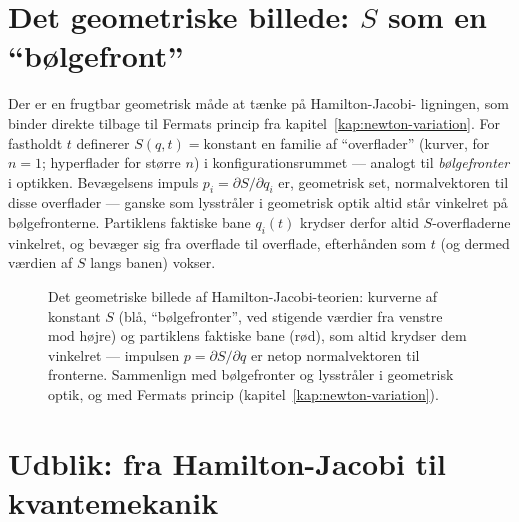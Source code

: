 \section{Det geometriske billede: $S$ som en ``bølgefront''}

Der er en frugtbar geometrisk måde at tænke på Hamilton-Jacobi-
ligningen, som binder direkte tilbage til Fermats princip fra
kapitel~\ref{kap:newton-variation}. For fastholdt $t$ definerer
$S(q,t)=\text{konstant}$ en familie af ``overflader'' (kurver, for
$n=1$; hyperflader for større $n$) i konfigurationsrummet — analogt til
\emph{bølgefronter} i optikken. Bevægelsens impuls $p_i=\partial S/\partial q_i$
er, geometrisk set, normalvektoren til disse overflader — ganske som
lysstråler i geometrisk optik altid står vinkelret på bølgefronterne.
Partiklens faktiske bane $q_i(t)$ krydser derfor altid
$S$-overfladerne vinkelret, og bevæger sig fra overflade til overflade,
efterhånden som $t$ (og dermed værdien af $S$ langs banen) vokser.

\begin{figure}[htbp]
  \centering
  \caption{Det geometriske billede af Hamilton-Jacobi-teorien: kurverne
  af konstant $S$ (blå, ``bølgefronter'', ved stigende værdier fra
  venstre mod højre) og partiklens faktiske bane (rød), som altid
  krydser dem vinkelret — impulsen $p=\partial S/\partial q$ er netop
  normalvektoren til fronterne. Sammenlign med bølgefronter og
  lysstråler i geometrisk optik, og med Fermats princip
  (kapitel~\ref{kap:newton-variation}).}
  \label{fig:hj-boelgefront}
\end{figure}

\section{Udblik: fra Hamilton-Jacobi til kvantemekanik}
\label{sec:hj-og-kvante}

